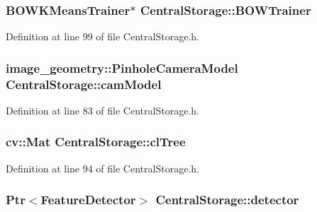 \hypertarget{classCentralStorage_aa30a8d753544480abd495023cbf62a2f}{
\subsubsection[{\-B\-O\-W\-Trainer}]{\setlength{\rightskip}{0pt plus 5cm}\-B\-O\-W\-K\-Means\-Trainer$\ast$ {\bf \-Central\-Storage\-::\-B\-O\-W\-Trainer}}}\label{classCentralStorage_aa30a8d753544480abd495023cbf62a2f}


\-Definition at line 99 of file \-Central\-Storage.\-h.

\hypertarget{classCentralStorage_adfcd7e35336daa5d959f783c9180460f}{
\subsubsection[{cam\-Model}]{\setlength{\rightskip}{0pt plus 5cm}image\-\_\-geometry\-::\-Pinhole\-Camera\-Model {\bf \-Central\-Storage\-::cam\-Model}}}\label{classCentralStorage_adfcd7e35336daa5d959f783c9180460f}


\-Definition at line 83 of file \-Central\-Storage.\-h.

\hypertarget{classCentralStorage_a5d9e98c4102f50187f6a034a99ef9793}{
\subsubsection[{cl\-Tree}]{\setlength{\rightskip}{0pt plus 5cm}cv\-::\-Mat {\bf \-Central\-Storage\-::cl\-Tree}}}\label{classCentralStorage_a5d9e98c4102f50187f6a034a99ef9793}


\-Definition at line 94 of file \-Central\-Storage.\-h.

\hypertarget{classCentralStorage_a3853e38f8eadbe09da6a1855b29704f7}{
\subsubsection[{detector}]{\setlength{\rightskip}{0pt plus 5cm}\-Ptr$<$\-Feature\-Detector$>$ {\bf \-Central\-Storage\-::detector}}}\label{classCentralStorage_a3853e38f8eadbe09da6a1855b29704f7}


